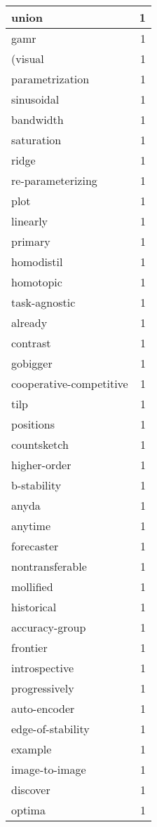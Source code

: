 \begin{table}[h]
\begin{tabular}{|l|r|}
\hline
union & 1 \\
\hline
gamr & 1 \\
\hline
(visual & 1 \\
\hline
parametrization & 1 \\
\hline
sinusoidal & 1 \\
\hline
bandwidth & 1 \\
\hline
saturation & 1 \\
\hline
ridge & 1 \\
\hline
re-parameterizing & 1 \\
\hline
plot & 1 \\
\hline
linearly & 1 \\
\hline
primary & 1 \\
\hline
homodistil & 1 \\
\hline
homotopic & 1 \\
\hline
task-agnostic & 1 \\
\hline
already & 1 \\
\hline
contrast & 1 \\
\hline
gobigger & 1 \\
\hline
cooperative-competitive & 1 \\
\hline
tilp & 1 \\
\hline
positions & 1 \\
\hline
countsketch & 1 \\
\hline
higher-order & 1 \\
\hline
b-stability & 1 \\
\hline
anyda & 1 \\
\hline
anytime & 1 \\
\hline
forecaster & 1 \\
\hline
nontransferable & 1 \\
\hline
mollified & 1 \\
\hline
historical & 1 \\
\hline
accuracy-group & 1 \\
\hline
frontier & 1 \\
\hline
introspective & 1 \\
\hline
progressively & 1 \\
\hline
auto-encoder & 1 \\
\hline
edge-of-stability & 1 \\
\hline
example & 1 \\
\hline
image-to-image & 1 \\
\hline
discover & 1 \\
\hline
optima & 1 \\
\hline

\end{tabular}
\end{table}
